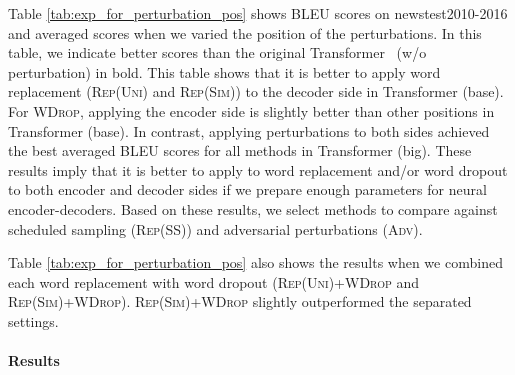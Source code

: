 \documentclass[11pt]{article}
\newcommand{\uniform}{\textsc{Rep(Uni)}}
\newcommand{\parass}{\textsc{Rep(SS)}}
\newcommand{\similarity}{\textsc{Rep(Sim)}}
\newcommand{\worddrop}{\textsc{WDrop}}
\newcommand{\adv}{\textsc{Adv}}
\begin{document}
Table \ref{tab:exp_for_perturbation_pos} shows BLEU scores on newstest2010-2016 and averaged scores when we varied the position of the perturbations.
In this table, we indicate better scores than the original Transformer~\cite{NIPS2017_7181} (w/o perturbation) in bold.
This table shows that it is better to apply word replacement (\uniform{} and \similarity{}) to the decoder side in Transformer (base).
For \worddrop{}, applying the encoder side is slightly better than other positions in Transformer (base).
In contrast, applying perturbations to both sides achieved the best averaged BLEU scores for all methods in Transformer (big).
These results imply that it is better to apply to word replacement and/or word dropout to both encoder and decoder sides if we prepare enough parameters for neural encoder-decoders.
Based on these results, we select methods to compare against scheduled sampling (\parass{}) and adversarial perturbations (\adv{}).


Table \ref{tab:exp_for_perturbation_pos} also shows the results when we combined each word replacement with word dropout (\uniform{}+\worddrop{} and \similarity{}+\worddrop{}).
\similarity{}+\worddrop{} slightly outperformed the separated settings.


\paragraph{Results}
\end{document}
